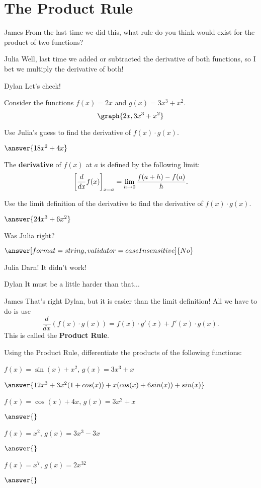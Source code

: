 \documentclass{ximera}
\begin{document}
\section{The Product Rule}
\begin{dialogue}
\item[James] From the last time we did this, what rule do you think would exist for the product of two functions?
\item[Julia] Well, last time we added or subtracted the derivative of both functions, so I bet we multiply the derivative of both!
\item[Dylan] Let's check!
\end{dialogue}
Consider the functions $f(x) = 2x$ and $g(x) = 3x^3 + x^2$.
\[
\graph{2x, 3x^3+x^2}
\]
\begin{question}
Use Julia's guess to find the derivative of $f(x) \cdot g(x)$.

$\answer{18x^2+4x}$

\begin{definition}
  The \textbf{derivative} of $f(x)$ at $a$ is defined by the following limit:
  \[
  \bigg[ \frac{d}{dx} f(x) \bigg]_{x=a} = \lim_{h\to 0} \frac{f(a+h) - f(a)}{h}.
  \]
\end{definition}

Use the limit definition of the derivative to find the derivative of $f(x) \cdot g(x)$.

$\answer{24x^3+6x^2}$

Was Julia right?

$\answer[format=string,validator=caseInsensitive]{No}$
\end{question}
\begin{dialogue}
\item[Julia] Darn! It didn't work!
\item[Dylan] It must be a little harder than that...
\item[James] That's right Dylan, but it is easier than the limit definition! All we have to do is use $$\frac{d}{dx}\left(f(x)\cdot g(x)\right)= f(x)\cdot g'(x) + f'(x)\cdot g(x)\text{.}$$ This is called the \textbf{Product Rule}.
\end{dialogue}
\begin{question}
Using the Product Rule, differentiate the products of the following functions:

$f(x) = \sin(x)+x^2$, $g(x) = 3x^3+x$

$\answer{12x^3+3x^2(1+cos(x))+x(cos(x)+6sin(x))+sin(x)}$

$f(x) = \cos(x)+4x$, $g(x) = 3x^2+x$

$\answer{}$

$f(x) = x^2$, $g(x) = 3x^3-3x$

$\answer{}$

$f(x) = x^7$, $g(x) = 2x^{32}$

$\answer{}$

\end{question}
\end{document}
